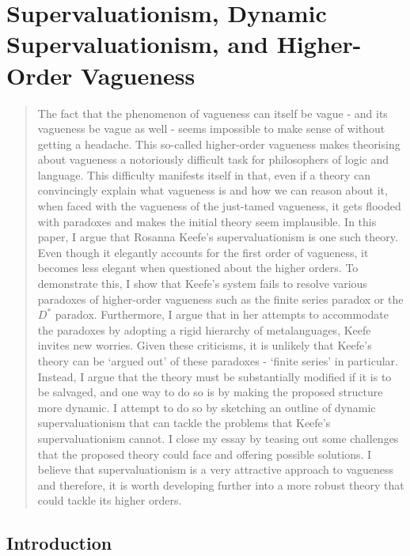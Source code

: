 \chapter{Supervaluationism, Dynamic Supervaluationism, and Higher-Order Vagueness}
\renewcommand*{\thesection}{\arabic{section}.}
\renewcommand*{\thesubsection}{\arabic{section}.\arabic{subsection}.}

\begin{quote}
The fact that the phenomenon of vagueness can itself be vague
- and its vagueness be vague as well - seems impossible to make sense of
without getting a headache. This so-called higher-order vagueness makes
theorising about vagueness a notoriously difficult task for philosophers
of logic and language. This difficulty manifests itself in that, even if
a theory can convincingly explain what vagueness is and how we can
reason about it, when faced with the vagueness of the just-tamed
vagueness, it gets flooded with paradoxes and makes the initial theory
seem implausible. In this paper, I argue that Rosanna Keefe's
supervaluationism is one such theory. Even though it elegantly accounts
for the first order of vagueness, it becomes less elegant when
questioned about the higher orders. To demonstrate this, I show that
Keefe's system fails to resolve various paradoxes of higher-order
vagueness such as the finite series paradox or the $D^*$ paradox.
Furthermore, I argue that in her attempts to accommodate the paradoxes
by adopting a rigid hierarchy of metalanguages, Keefe invites new
worries. Given these criticisms, it is unlikely that Keefe's theory can
be `argued out' of these paradoxes - `finite series' in particular.
Instead, I argue that the theory must be substantially modified if it is
to be salvaged, and one way to do so is by making the proposed structure
more dynamic. I attempt to do so by sketching an outline of dynamic
supervaluationism that can tackle the problems that Keefe's
supervaluationism cannot. I close my essay by teasing out some
challenges that the proposed theory could face and offering possible
solutions. I believe that supervaluationism is a very attractive
approach to vagueness and therefore, it is worth developing further into
a more robust theory that could tackle its higher orders.
\end{quote}

\section{Introduction}

